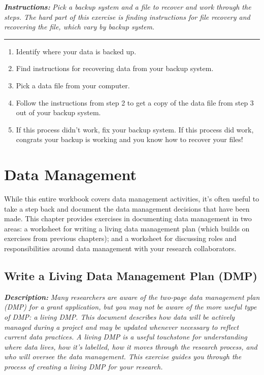 \documentclass[
]{book}
\providecommand{\tightlist}{%
  \setlength{\itemsep}{0pt}\setlength{\parskip}{0pt}}
\begin{document}
\textbf{\emph{Instructions:}} \emph{Pick a backup system and a file to recover and work through the steps. The hard part of this exercise is finding instructions for file recovery and recovering the file, which vary by backup system.}

\begin{center}\rule{0.5\linewidth}{0.5pt}\end{center}

\begin{enumerate}
\def\labelenumi{\arabic{enumi}.}
\tightlist
\item
  Identify where your data is backed up.
\item
  Find instructions for recovering data from your backup system.
\item
  Pick a data file from your computer.
\item
  Follow the instructions from step 2 to get a copy of the data file from step 3 out of your backup system.
\item
  If this process didn't work, fix your backup system. If this process did work, congrats your backup is working and you know how to recover your files!
\end{enumerate}

\hypertarget{data-management}{%
\chapter{Data Management}\label{data-management}}

While this entire workbook covers data management activities, it's often useful to take a step back and document the data management decisions that have been made. This chapter provides exercises in documenting data management in two areas: a worksheet for writing a living data management plan (which builds on exercises from previous chapters); and a worksheet for discussing roles and responsibilities around data management with your research collaborators.

\hypertarget{living-dmp}{%
\section{Write a Living Data Management Plan (DMP)}\label{living-dmp}}

\textbf{\emph{Description:}} \emph{Many researchers are aware of the two-page data management plan (DMP) for a grant application, but you may not be aware of the more useful type of DMP: a living DMP. This document describes how data will be actively managed during a project and may be updated whenever necessary to reflect current data practices. A living DMP is a useful touchstone for understanding where data lives, how it's labelled, how it moves through the research process, and who will oversee the data management. This exercise guides you through the process of creating a living DMP for your research.}
\end{document}
